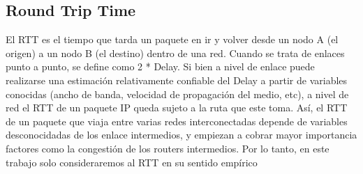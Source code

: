 \subsection {Round Trip Time}

El RTT es el tiempo que tarda un paquete en ir y volver desde un nodo A (el origen) a un nodo B (el destino) dentro de una red. 
Cuando se trata de enlaces punto a punto, se define como 2 * Delay. 
Si bien a nivel de enlace puede realizarse una estimación relativamente confiable del Delay a partir de variables conocidas (ancho de banda, velocidad de propagación del medio, etc), a nivel de red el RTT de un paquete IP queda sujeto a la ruta que este toma.
Así, el RTT de un paquete que viaja entre varias redes interconectadas depende de variables desconocidadas de los enlace intermedios, y empiezan a cobrar mayor importancia factores como la congestión de los routers intermedios. Por lo tanto, en este trabajo solo consideraremos al RTT en su sentido empírico
	

